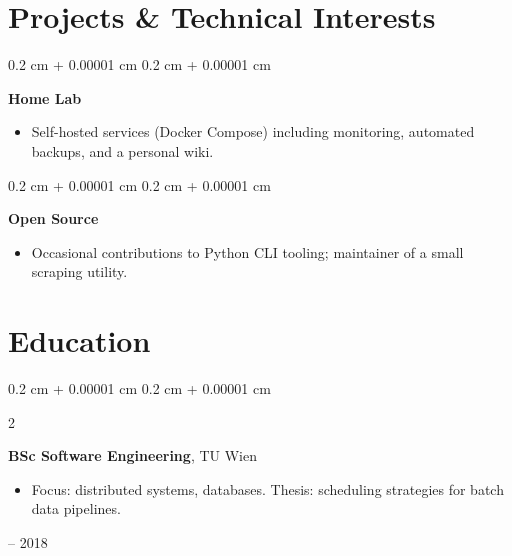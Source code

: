 \documentclass[9pt, letterpaper]{article}
\newenvironment{highlights}{
    \begin{itemize}[
        topsep=0.10 cm,
        parsep=0.10 cm,
        partopsep=0pt,
        itemsep=0pt,
        leftmargin=0.4 cm + 10pt
    ]
}{
    \end{itemize}
}
\newenvironment{onecolentry}{
    \begin{adjustwidth}{
        0.2 cm + 0.00001 cm
    }{
        0.2 cm + 0.00001 cm
    }
}{
    \end{adjustwidth}
}
\newenvironment{twocolentry}[2][]{
    \onecolentry
    \def\secondColumn{#2}
    \setcolumnwidth{\fill, 4.5 cm}
    \begin{paracol}{2}
}{
    \switchcolumn \raggedleft \secondColumn
    \end{paracol}
    \endonecolentry
}
\begin{document}
    \section{Projects \& Technical Interests}

        \begin{onecolentry}
            \textbf{Home Lab}
            \begin{highlights}
                \item Self-hosted services (Docker Compose) including monitoring, automated backups, and a personal wiki.
            \end{highlights}
        \end{onecolentry}

        \begin{onecolentry}
            \textbf{Open Source}
            \begin{highlights}
                \item Occasional contributions to Python CLI tooling; maintainer of a small scraping utility.
            \end{highlights}
        \end{onecolentry}

    \section{Education}

        \begin{twocolentry}{
            2014 -- 2018
        }
            \textbf{BSc Software Engineering}, TU Wien
            \begin{highlights}
                \item Focus: distributed systems, databases. Thesis: scheduling strategies for batch data pipelines.
            \end{highlights}
        \end{twocolentry}
\end{document}
